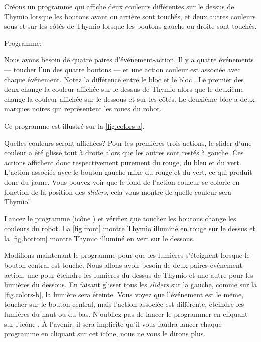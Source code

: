 

Créons un programme qui affiche deux couleurs différentes sur le dessus de Thymio lorsque les boutons avant ou arrière sont touchés, et deux autres couleurs sous et sur les côtés de Thymio lorsque les boutons gauche ou droite sont touchés.

{\raggedleft \hfill Programme: }

Nous avons besoin de quatre paires d'événement-action.
Il y a quatre événements --- toucher l'un des quatre boutons --- et une action couleur est associée avec chaque événement.
Notez la différence entre le bloc  et le bloc . Le premier des deux change la couleur affichée sur le dessus de Thymio alors que le deuxième change la couleur affichée sur le dessous et sur les côtés. Le deuxième bloc a deux marques noires qui représentent les roues du robot.

Ce programme est illustré sur la \cref{fig.colors-a}.

Quelles couleurs seront affichées? Pour les premières trois actions, le slider d'une couleur a été glissé tout à droite alors que les autres sont restés à gauche.
Ces actions affichent donc respectivement purement du rouge, du bleu et du vert.
L'action associée avec le bouton gauche mixe du rouge et du vert, ce qui produit donc du jaune.
Vous pouvez voir que le fond de l'action couleur se colorie en fonction de la position des \textit{sliders}, cela vous montre de quelle couleur sera Thymio!

Lancez le programme (icône ) et vérifiez que toucher les boutons change les couleurs du robot.
La \cref{fig.front} montre Thymio illuminé en rouge sur le dessus et la \cref{fig.bottom} montre Thymio illuminé en vert sur le dessous.



Modifions maintenant le programme pour que les lumières s'éteignent lorsque le bouton central est touché. Nous allons avoir besoin de deux paires événement-action, une pour éteindre les lumières du dessus de Thymio et une autre pour les lumières du dessous. En faisant glisser tous les \textit{sliders} sur la gauche, comme sur la \cref{fig.colors-b}, la lumière sera éteinte.
Vous voyez que l'événement est le même, toucher sur le bouton central, mais l'action associée est différente, éteindre les lumières du haut ou du bas.
N'oubliez pas de lancer le programmer en cliquant sur l'icône .
À l'avenir, il sera implicite qu'il vous faudra lancer chaque programme en cliquant sur cet icône, nous ne vous le dirons plus.

